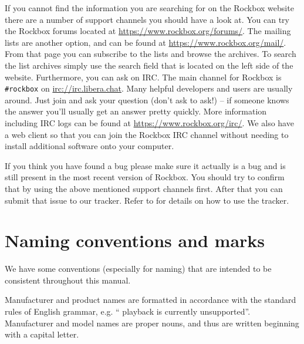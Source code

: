 If you cannot find the information you are searching for on the Rockbox
website there are a number of support channels you should have a look at.
You can try the Rockbox forums located at \url{https://www.rockbox.org/forums/}.
The mailing lists are another option, and can be found at
\url{https://www.rockbox.org/mail/}. From that page you can subscribe to the
lists and browse the archives. To search the list archives simply use
the search field that is located on the left side of the website.
Furthermore,  you can ask on IRC. The main channel for Rockbox is
\texttt{\#rockbox} on \url{irc://irc.libera.chat}. Many helpful developers
and users are usually around. Just join and ask your question (don't ask to
ask!) -- if someone knows the answer you'll
usually get an answer pretty quickly. More information including IRC logs
can be found at \url{https://www.rockbox.org/irc/}. We also have a web client
so that you can join the Rockbox IRC channel without needing
to install additional software onto your computer.

If you think you have found a bug please make sure it actually is a bug and is
still present in the most recent version of Rockbox. You should try to
confirm that by using the above mentioned support channels first. After that
you can submit that issue to our tracker. Refer to 
for details on how to use the tracker.


\section{Naming conventions and marks}
We have some conventions (especially for naming) that are intended to be
consistent throughout this manual.

Manufacturer and product names are formatted in accordance with the standard
rules of English grammar, e.g. ``\playerman{} playback is currently
unsupported''. Manufacturer and model names are proper nouns, and
thus are written beginning with a capital letter.

